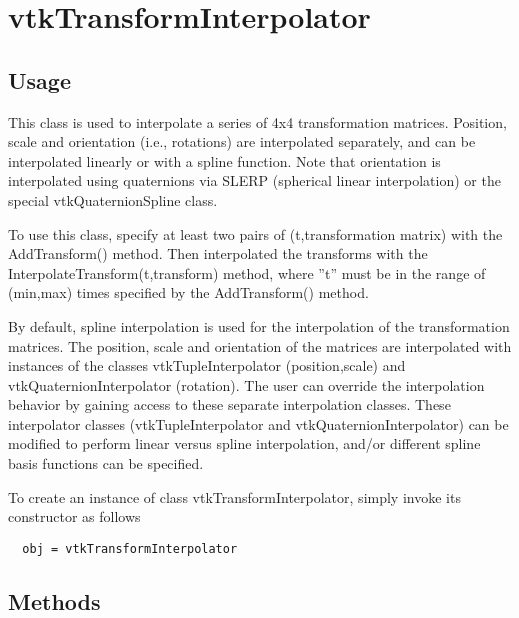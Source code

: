 \section{vtkTransformInterpolator}

\subsection{Usage}

 This class is used to interpolate a series of 4x4 transformation
 matrices. Position, scale and orientation (i.e., rotations) are
 interpolated separately, and can be interpolated linearly or with a spline
 function. Note that orientation is interpolated using quaternions via
 SLERP (spherical linear interpolation) or the special vtkQuaternionSpline
 class.

 To use this class, specify at least two pairs of (t,transformation matrix)
 with the AddTransform() method.  Then interpolated the transforms with the
 InterpolateTransform(t,transform) method, where ''t'' must be in the range
 of (min,max) times specified by the AddTransform() method.

 By default, spline interpolation is used for the interpolation of the
 transformation matrices. The position, scale and orientation of the
 matrices are interpolated with instances of the classes
 vtkTupleInterpolator (position,scale) and vtkQuaternionInterpolator
 (rotation). The user can override the interpolation behavior by gaining
 access to these separate interpolation classes.  These interpolator
 classes (vtkTupleInterpolator and vtkQuaternionInterpolator) can be
 modified to perform linear versus spline interpolation, and/or different
 spline basis functions can be specified.


To create an instance of class vtkTransformInterpolator, simply
invoke its constructor as follows
\begin{verbatim}
  obj = vtkTransformInterpolator
\end{verbatim}
\subsection{Methods}

